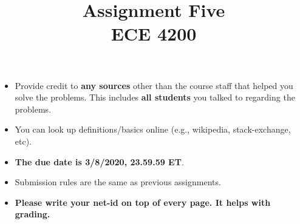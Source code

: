 \documentclass[11pt]{article}
\title{Assignment Five\\ ECE 4200}
\date{}
\begin{document}
\maketitle 


\begin{itemize}
\item
Provide credit to \textbf{any sources} other than the course staff that helped you solve the problems. This includes \textbf{all students} you talked to regarding the problems. 	
\item
You can look up definitions/basics online (e.g., wikipedia, stack-exchange, etc).
\item
{\bf The due date is 3/8/2020, 23.59.59 ET}. 
\item
Submission rules are the same as previous assignments.
\item
\textbf{Please write your net-id on top of every page. It helps with grading.}
\end{itemize}
\end{document}
